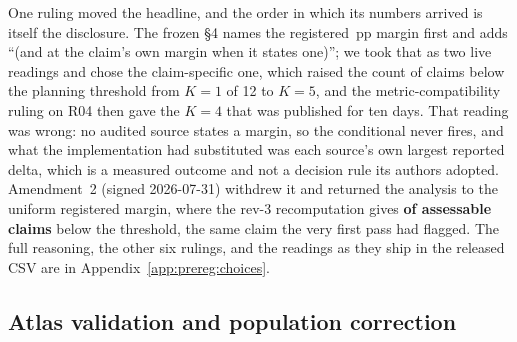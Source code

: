 %
%
One ruling moved the headline, and the order in which its numbers arrived is
itself the disclosure. The frozen §4 names the registered
\AuditMarginPP{}\,pp margin first and adds ``(and at the claim's own margin when
it states one)''; we took that as two live readings and chose the
claim-specific one, which raised the count of claims below the planning
threshold from $K = 1$ of 12 to $K = 5$, and the metric-compatibility ruling on
R04 then gave the $K = 4$ that was published for ten days. That reading was
wrong: no audited source states a margin, so the conditional never fires, and
what the implementation had substituted was each source's own largest reported
delta, which is a measured outcome and not a decision rule its authors adopted.
Amendment~2 (signed 2026-07-31) withdrew it and returned the analysis to the
uniform registered margin, where the rev-3 recomputation gives
\textbf{\AuditBelowThresholdAtMedian{} of \AuditAssessable{} assessable claims}
below the threshold, the same claim the very first pass had flagged. The full
reasoning, the other six rulings, and the readings as they ship in the released
CSV are in Appendix~\ref{app:prereg:choices}.

\subsection{Atlas validation and population correction}
\label{sec:prereg-spotcheck}

